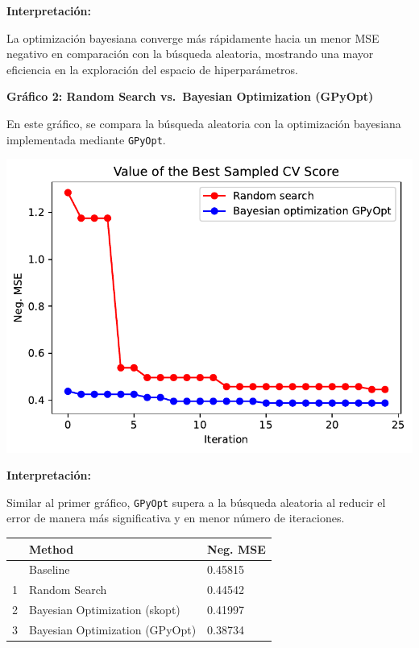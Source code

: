 \documentclass[
  12pt,
  letterpaper,
  DIV=11,
  numbers=noendperiod]{scrartcl}
\begin{document}
\textbf{Interpretación:}

La optimización bayesiana converge más rápidamente hacia un menor MSE
negativo en comparación con la búsqueda aleatoria, mostrando una mayor
eficiencia en la exploración del espacio de hiperparámetros.

\newpage

\textbf{Gráfico 2: Random Search vs.~Bayesian Optimization (GPyOpt)}

En este gráfico, se compara la búsqueda aleatoria con la optimización
bayesiana implementada mediante \texttt{GPyOpt}.

\includegraphics{ProyFinal_OptBayesiana_2024_y_files/figure-pdf/cell-25-output-1.pdf}

\textbf{Interpretación:}

Similar al primer gráfico, \texttt{GPyOpt} supera a la búsqueda
aleatoria al reducir el error de manera más significativa y en menor
número de iteraciones.

\begin{longtable}[]{@{}lll@{}}
\toprule\noalign{}
& Method & Neg. MSE \\
\midrule\noalign{}
\endhead
\bottomrule\noalign{}
\endlastfoot
0 & Baseline & 0.45815 \\
1 & Random Search & 0.44542 \\
2 & Bayesian Optimization (skopt) & 0.41997 \\
3 & Bayesian Optimization (GPyOpt) & 0.38734 \\
\end{longtable}
\end{document}
